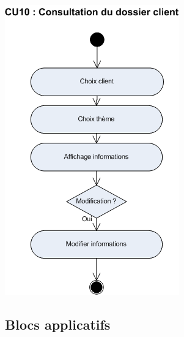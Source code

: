 \begin {center}
\includegraphics[width=\textwidth]{../../diagrammeActivite/DACU10.png}
\end {center}

\subsection{Blocs applicatifs}

